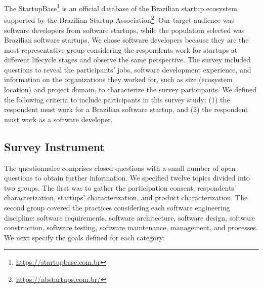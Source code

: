 \documentclass[runningheads]{llncs}
\begin{document}
The StartupBase\footnote{\url{https://startupbase.com.br}} is an official database of the Brazilian startup ecosystem supported by the Brazilian Startup Association\footnote{\url{https://abstartups.com.br/}}. Our target audience was software developers from software startups, while the population selected was Brazilian software startups. We chose software developers because they are the most representative group considering the respondents work for startups at different lifecycle stages and observe the same perspective. The survey included questions to reveal the participants' jobs, software development experience, and information on the organizations they worked for, such as size (ecosystem location) and project domain, to characterize the survey participants. We defined the following criteria to include participants in this survey study: (1) the respondent must work for a Brazilian software startup, and (2) the respondent must work as a software developer.

\subsection{Survey Instrument}
\label{subsection:instrument}

The questionnaire comprises closed questions with a small number of open questions to obtain further information. We specified twelve topics divided into two groups. The first was to gather the participation consent, respondents' characterization, startups' characterization, and product characterization. The second group covered the practices considering each software engineering discipline: software requirements, software architecture, software design, software construction, software testing, software maintenance, management, and processes. We next specify the goals defined for each category:
\end{document}
